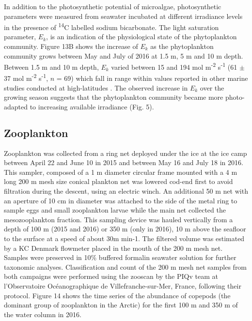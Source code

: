 \documentclass[essd, manuscript]{copernicus}
\begin{document}
In addition to the photosynthetic potential of microalgae, photosynthetic parameters were measured from seawater incubated at different irradiance levels in the presence of \textsuperscript{14}C labelled sodium bicarbonate. The light saturation parameter, $E_k$, is an indication of the physiological state of the phytoplankton community. Figure 13B shows the increase of $E_k$ as the phytoplankton community grows between May and July of 2016 at 1.5 m, 5 m and 10 m depth. Between 1.5 m and 10 m depth, $E_k$ varied between 15 and 194 \textmu mol m\textsuperscript{-2} s\textsuperscript{-1} (61 $\pm$ 37 \textmu mol m\textsuperscript{-2} s\textsuperscript{-1}, $n$ = 69) which fall in range within values reported in other marine studies conducted at high-latitudes \citep{Bouman2018, Massicotte2019}. The observed increase in $E_k$ over the growing season suggests that the phytoplankton community became more photo-adapted to increasing available irradiance (Fig. 5). 

\subsection{Zooplankton}

Zooplankton was collected from a ring net deployed under the ice at the ice camp between April 22 and June 10 in 2015 and between May 16 and July 18 in 2016. This sampler, composed of a 1 m diameter circular frame mounted with a 4 m long 200 \textmu m mesh size conical plankton net was lowered cod-end first to avoid filtration during the descent, using an electric winch. An additional 50 \textmu m net with an aperture of 10 cm in diameter was attached to the side of the metal ring to sample eggs and small zooplankton larvae while the main net collected the mesozooplankton fraction. This sampling device was hauled vertically from a depth of 100 m (2015 and 2016) or 350 m (only in 2016), 10 m above the seafloor to the surface at a speed of about 30m min-1. The filtered volume was estimated by a KC Denmark flowmeter placed in the mouth of the 200 \textmu m mesh net. Samples were preserved in 10\% buffered formalin seawater solution for further taxonomic analyses. Classification and count of the 200 \textmu m mesh net samples from both campaigns were performed using the zooscan by the PIQv team at l’Observatoire Océanographique de Villefranche-sur-Mer, France, following their protocol. Figure 14 shows the time series of the abundance of copepods (the dominant group of zooplankton in the Arctic) for the first 100 m and 350 m of the water column in 2016.
\end{document}
